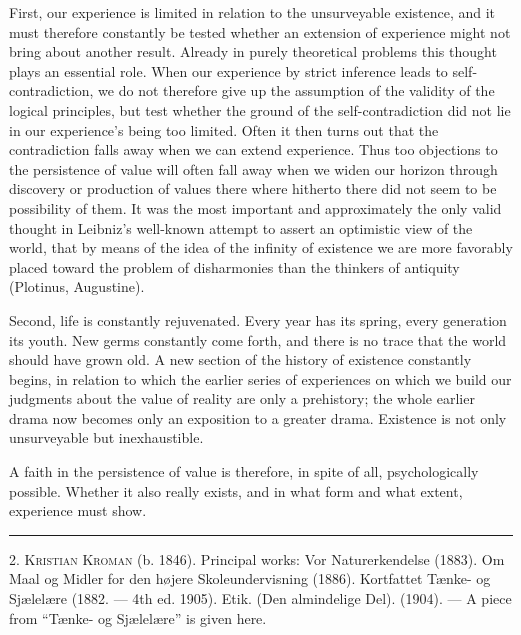 \documentclass[12pt,a4paper,openany]{book}
\newcommand{\opage}[1]{\marginnote{\footnotesize\textit{[#1]}}}
\newenvironment{intro}{\par}{\par}
\newcommand{\sectionrule}{\par\begin{center}\rule{4em}{0.4pt}\end{center}}
\begin{document}
First, our experience is limited in relation to the unsurveyable existence, and it must
therefore constantly be tested whether an extension of experience might not bring about
another result. Already in purely theoretical problems this thought plays an essential
role. When our experience by strict inference leads to self-contradiction, we do not
therefore give up the assumption of the validity of the logical principles, but test
whether the ground of the self-contradiction did not lie in our experience's being too
limited. Often it then turns out that the contradiction falls away when we can extend
experience. Thus too objections to the persistence of value will often fall away when we
widen our horizon through discovery or production of values there where hitherto there
did not seem to be possibility
\setcounter{footnote}{0}%
\opage{247}of them. It was the most important and approximately the only valid thought in
Leibniz's well-known attempt to assert an optimistic view of the world, that by means of
the idea of the infinity of existence we are more favorably placed toward the problem of
disharmonies than the thinkers of antiquity (Plotinus, Augustine).


Second, life is constantly rejuvenated. Every year has its spring, every generation its
youth. New germs constantly come forth, and there is no trace that the world should have
grown old. A new section of the history of existence constantly begins, in relation to
which the earlier series of experiences on which we build our judgments about the value
of reality are only a prehistory; the whole earlier drama now becomes only an exposition
to a greater drama. Existence is not only unsurveyable but inexhaustible.

A faith in the persistence of value is therefore, in spite of all, psychologically
possible. Whether it also really exists, and in what form and what extent, experience
must show.

\sectionrule

\begin{intro}

2. \textsc{Kristian Kroman} (b. 1846). Principal works: Vor Naturerkendelse %
(1883). Om Maal og Midler for den højere Skoleundervisning
(1886). Kortfattet Tænke- og Sjælelære (1882. ---
4th ed. 1905). Etik. (Den almindelige Del). (1904). --- A piece
from ``Tænke- og Sjælelære'' is given here.
\end{intro}
\end{document}
